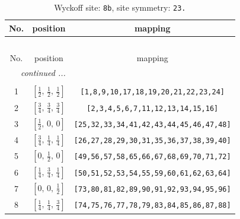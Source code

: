 \documentclass[fleqn,8pt]{jsarticle}
\begin{document}
\begin{longtable}{ccc}
\caption{Wyckoff site: {\tt 8b}, site symmetry: {\tt 23.}}
 \\
 \hline \hline
No. & position & mapping \\ \hline \endfirsthead

\multicolumn{2}{l}{\tablename\ \thetable{}} \\
 \hline \hline
No. & position & mapping \\ \hline \endhead

 \hline \hline
\multicolumn{2}{r}{\footnotesize\it continued ...} \\ \endfoot

 \hline \hline
\multicolumn{2}{r}{} \\ \endlastfoot

1 & $\left[ \frac{1}{2},\, \frac{1}{2},\, \frac{1}{2} \right]$ & {\tt [1,8,9,10,17,18,19,20,21,22,23,24]} \\ \hline
2 & $\left[ \frac{3}{4},\, \frac{3}{4},\, \frac{3}{4} \right]$ & {\tt [2,3,4,5,6,7,11,12,13,14,15,16]} \\ \hline
3 & $\left[ \frac{1}{2},\, 0,\, 0 \right]$ & {\tt [25,32,33,34,41,42,43,44,45,46,47,48]} \\ \hline
4 & $\left[ \frac{3}{4},\, \frac{1}{4},\, \frac{1}{4} \right]$ & {\tt [26,27,28,29,30,31,35,36,37,38,39,40]} \\ \hline
5 & $\left[ 0,\, \frac{1}{2},\, 0 \right]$ & {\tt [49,56,57,58,65,66,67,68,69,70,71,72]} \\ \hline
6 & $\left[ \frac{1}{4},\, \frac{3}{4},\, \frac{1}{4} \right]$ & {\tt [50,51,52,53,54,55,59,60,61,62,63,64]} \\ \hline
7 & $\left[ 0,\, 0,\, \frac{1}{2} \right]$ & {\tt [73,80,81,82,89,90,91,92,93,94,95,96]} \\ \hline
8 & $\left[ \frac{1}{4},\, \frac{1}{4},\, \frac{3}{4} \right]$ & {\tt [74,75,76,77,78,79,83,84,85,86,87,88]} \\
\end{longtable}
\renewcommand{\arraystretch}{1.2}
\end{document}
